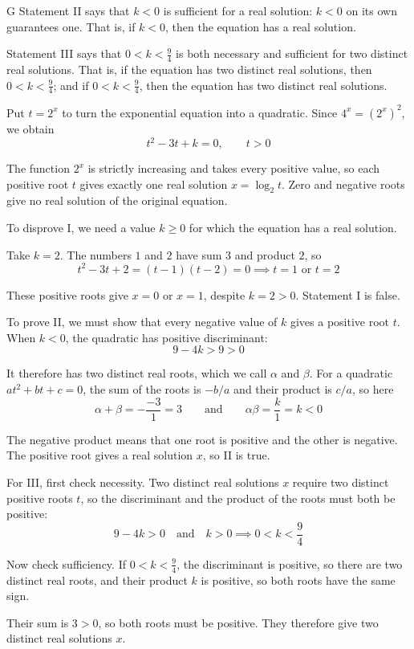 \documentclass[11pt,a4paper]{article}
\begin{document}
\begin{enumerate}[label=\textbf{\arabic*.},leftmargin=*,itemsep=0pt,start=3]
\begin{djsSolution}{G}
Statement II says that $k<0$ is sufficient for a real solution: $k<0$ on its own guarantees one. That is, if $k<0$, then the equation has a real solution.

Statement III says that $0<k<\frac94$ is both necessary and sufficient for two distinct real solutions. That is, if the equation has two distinct real solutions, then $0<k<\frac94$; and if $0<k<\frac94$, then the equation has two distinct real solutions.

Put $t=2^x$ to turn the exponential equation into a quadratic. Since $4^x=(2^x)^2$, we obtain
\[
t^2-3t+k=0,\qquad t>0
\]

The function $2^x$ is strictly increasing and takes every positive value, so each positive root $t$ gives exactly one real solution $x=\log_2 t$. Zero and negative roots give no real solution of the original equation.

To disprove I, we need a value $k\geq0$ for which the equation has a real solution.

Take $k=2$. The numbers $1$ and $2$ have sum $3$ and product $2$, so
\[
t^2-3t+2=(t-1)(t-2)=0
\implies t=1\text{ or }t=2
\]

These positive roots give $x=0$ or $x=1$, despite $k=2>0$. Statement I is false.

To prove II, we must show that every negative value of $k$ gives a positive root $t$. When $k<0$, the quadratic has positive discriminant:
\[
9-4k>9>0
\]

It therefore has two distinct real roots, which we call $\alpha$ and $\beta$. For a quadratic $at^2+bt+c=0$, the sum of the roots is $-b/a$ and their product is $c/a$, so here
\[
\alpha+\beta=-\frac{-3}{1}=3
\qquad\text{and}\qquad
\alpha\beta=\frac{k}{1}=k<0
\]

The negative product means that one root is positive and the other is negative. The positive root gives a real solution $x$, so II is true.

For III, first check necessity. Two distinct real solutions $x$ require two distinct positive roots $t$, so the discriminant and the product of the roots must both be positive:
\[
9-4k>0\quad\text{and}\quad k>0
\implies 0<k<\frac94
\]

Now check sufficiency. If $0<k<\frac94$, the discriminant is positive, so there are two distinct real roots, and their product $k$ is positive, so both roots have the same sign.

Their sum is $3>0$, so both roots must be positive. They therefore give two distinct real solutions $x$.


\end{djsSolution}
\end{enumerate}
\end{document}
